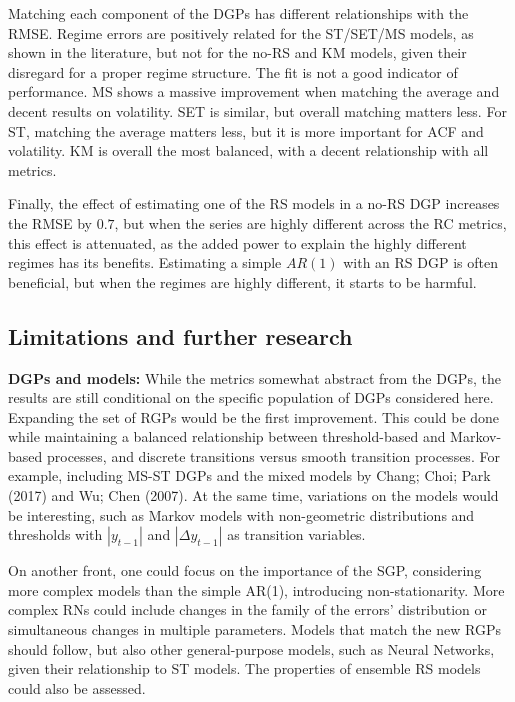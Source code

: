 \documentclass[
  letterpaper,
  DIV=11,
  numbers=noendperiod]{scrartcl}
\numberwithin{equation}{section}
\numberwithin{table}{section}
\numberwithin{figure}{section}
\begin{document}
Matching each component of the DGPs has different relationships with the
RMSE. Regime errors are positively related for the ST/SET/MS models, as
shown in the literature, but not for the no-RS and KM models, given
their disregard for a proper regime structure. The fit is not a good
indicator of performance. MS shows a massive improvement when matching
the average and decent results on volatility. SET is similar, but
overall matching matters less. For ST, matching the average matters
less, but it is more important for ACF and volatility. KM is overall the
most balanced, with a decent relationship with all metrics.

Finally, the effect of estimating one of the RS models in a no-RS DGP
increases the RMSE by \(0.7\), but when the series are highly different
across the RC metrics, this effect is attenuated, as the added power to
explain the highly different regimes has its benefits. Estimating a
simple \(AR(1)\) with an RS DGP is often beneficial, but when the
regimes are highly different, it starts to be harmful.

\subsection{Limitations and further research}\label{sec-conc-limit}

\textbf{DGPs and models:} While the metrics somewhat abstract from the
DGPs, the results are still conditional on the specific population of
DGPs considered here. Expanding the set of RGPs would be the first
improvement. This could be done while maintaining a balanced
relationship between threshold-based and Markov-based processes, and
discrete transitions versus smooth transition processes. For example,
including MS-ST DGPs and the mixed models by Chang; Choi; Park (2017)
and Wu; Chen (2007). At the same time, variations on the models would be
interesting, such as Markov models with non-geometric distributions and
thresholds with \(|y_{t-1}|\) and \(|\Delta y_{t-1}|\) as transition
variables.

On another front, one could focus on the importance of the SGP,
considering more complex models than the simple AR(1), introducing
non-stationarity. More complex RNs could include changes in the family
of the errors' distribution or simultaneous changes in multiple
parameters. Models that match the new RGPs should follow, but also other
general-purpose models, such as Neural Networks, given their
relationship to ST models. The properties of ensemble RS models could
also be assessed.
\end{document}
